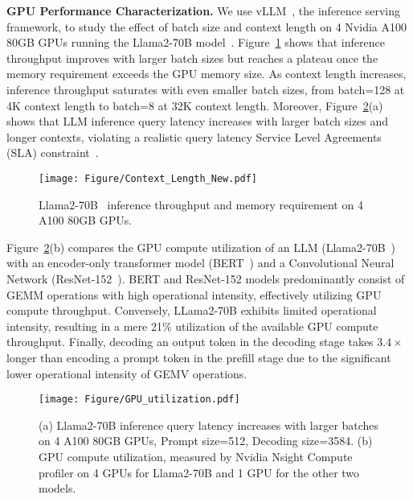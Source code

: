 \label{GPU Performance Characterization}
\textbf{GPU Performance Characterization.} We use vLLM~\cite{vLLM}, the \sota{} inference serving framework, to study the effect of batch size and context length on 4 Nvidia A100 80GB GPUs running the Llama2-70B model~\cite{touvron2023llama, longlora}.
Figure~\ref{fig:Context_Length} shows that inference throughput improves with larger batch sizes but reaches a plateau once the memory requirement exceeds the GPU memory size.
As context length increases, inference throughput saturates with even smaller batch sizes, from batch=128 at 4K context length to batch=8 at 32K context length.
Moreover, Figure~\ref{fig:GPU_utilization}(a) shows that LLM inference query latency increases with larger batch sizes and longer contexts, violating a realistic query latency Service Level Agreements (SLA) constraint~\cite{mlperf-sla}.

\begin{figure}[h]
\centering
    \texttt{[image: Figure/Context\_Length\_New.pdf]}
    \caption{Llama2-70B~\cite{touvron2023llama, longlora} inference throughput and memory requirement on 4 A100 80GB GPUs.}
    \label{fig:Context_Length}
\end{figure}

Figure~\ref{fig:GPU_utilization}(b) compares the GPU compute utilization of an LLM (Llama2-70B~\cite{touvron2023llama, longlora}) with an encoder-only transformer model (BERT~\cite{devlin2018bert}) and a Convolutional Neural Network (ResNet-152~\cite{he2016deep}).
BERT and ResNet-152 models predominantly consist of GEMM operations with high operational intensity, effectively utilizing GPU compute throughput.
Conversely, LLama2-70B exhibits limited operational intensity, resulting in a mere 21\% utilization of the available GPU compute throughput.
Finally, decoding an output token in the decoding stage takes $3.4\times$ longer than encoding a prompt token in the prefill stage due to the significant lower operational intensity of GEMV operations.


\begin{figure}[h]
\centering
    \texttt{[image: Figure/GPU\_utilization.pdf]}
    \caption{(a) Llama2-70B inference query latency increases with larger batches on 4 A100 80GB GPUs,  Prompt size=512, Decoding size=3584. (b) GPU compute utilization, measured by Nvidia Nsight Compute profiler on 4 GPUs for Llama2-70B and 1 GPU for the other two models.}
    \label{fig:GPU_utilization}
\end{figure}

